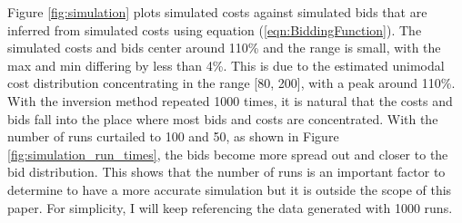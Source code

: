 \documentclass[11pt]{article}
\begin{document}
Figure \ref{fig:simulation} plots simulated costs against simulated bids that are 
inferred from simulated costs using equation (\ref{eqn:BiddingFunction}). 
The simulated costs and bids center around 110\% 
and the range is small, with the max and min differing by less than 4\%. This 
is due to the estimated unimodal cost distribution 
concentrating in the range [80, 200], with a peak around 110\%. 
With the inversion method repeated 1000 times, it is natural that 
the costs and bids fall into the place where most bids and costs are 
concentrated. With the number of runs curtailed to 100 and 50, as shown in 
Figure \ref{fig:simulation_run_times}, the bids become more spread out and 
closer to the bid distribution. This shows that the number of runs is 
an important factor to determine to have a more accurate simulation 
but it is outside the scope of this paper. For simplicity, I will keep 
referencing the data generated with 1000 runs. 
\end{document}
